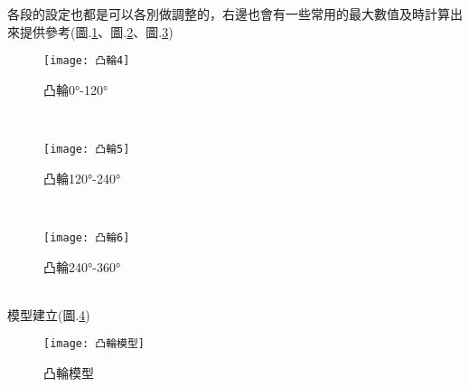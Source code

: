 \begin{itemize}
		各段的設定也都是可以各別做調整的，右邊也會有一些常用的最大數值及時計算出來提供參考(圖.\ref{2.14}、圖.\ref{2.15}、圖.\ref{2.16})
		\begin{figure}[hbt!]
		\begin{center}
		\texttt{[image: 凸輪4]}
		\caption{\Large 凸輪0°-120°}\label{2.14}
		\end{center}
		\end{figure}
		\\
		\begin{figure}[hbt!]
		\begin{center}
		\texttt{[image: 凸輪5]}
		\caption{\Large 凸輪120°-240°}\label{2.15}
		\end{center}
		\end{figure}
		\\
		\begin{figure}[hbt!]
		\begin{center}
		\texttt{[image: 凸輪6]}
		\caption{\Large 凸輪240°-360°}\label{2.16}
		\end{center}
		\end{figure}
		\\
		模型建立(圖.\ref{2.17})
		\begin{figure}[hbt!]
		\begin{center}
		\texttt{[image: 凸輪模型]}
		\caption{\Large 凸輪模型}\label{2.17}
		\end{center}
		\end{figure}
		\\
		
\newpage
	

\end{itemize}
